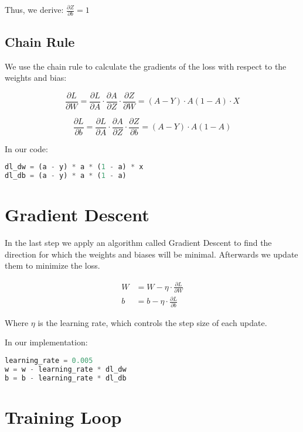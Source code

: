\documentclass{article}
\begin{document}
Thus, we derive: $\frac{\partial Z}{\partial b} = 1$

\subsection{Chain Rule}

We use the chain rule to calculate the gradients of the loss with respect to the weights and bias:

\begin{equation}
    \frac{\partial L}{\partial W} = \frac{\partial L}{\partial A} \cdot \frac{\partial A}{\partial Z} \cdot \frac{\partial Z}{\partial W} = (A - Y) \cdot A(1 - A) \cdot X
\end{equation}

\begin{equation}
    \frac{\partial L}{\partial b} = \frac{\partial L}{\partial A} \cdot \frac{\partial A}{\partial Z} \cdot \frac{\partial Z}{\partial b} = (A - Y) \cdot A(1 - A)
\end{equation}

In our code:

\begin{lstlisting}[language=Python]
dl_dw = (a - y) * a * (1 - a) * x
dl_db = (a - y) * a * (1 - a)
\end{lstlisting}

\section{Gradient Descent}

In the last step we apply an algorithm called Gradient Descent to find the direction for which the weights and biases will be minimal. Afterwards we update them to minimize the loss.

\begin{align}
    W &= W - \eta \cdot \frac{\partial L}{\partial W} \\
    b &= b - \eta \cdot \frac{\partial L}{\partial b}
\end{align}

Where $\eta$ is the learning rate, which controls the step size of each update.

In our implementation:

\begin{lstlisting}[language=Python]
learning_rate = 0.005
w = w - learning_rate * dl_dw
b = b - learning_rate * dl_db
\end{lstlisting}

\section{Training Loop}
\end{document}
